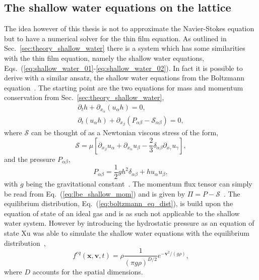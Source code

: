 \subsection{The shallow water equations on the lattice}\label{susbsec:shallow_water_lattice_boltzmann}

The idea however of this thesis is not to approximate the Navier-Stokes equation but to have a numerical solver for the thin film equation.
As outlined in Sec.~\ref{sec:theory_shallow_water} there is a system which has some similarities with the thin film equation, namely the shallow water equations, Eqs.~(\ref{eq:shallow_water_01}-\ref{eq:shallow_water_02}). 
In fact it is possible to derive with a similar ansatz, the shallow water equations from the Boltzmann equation~\cite{salmonLatticeBoltzmannMethod1999, zhouLatticeBoltzmannMethods2004, dellarNonhydrodynamicModesPriori2002}.
The starting point are the two equations for mass and momentum conservation from Sec.~\ref{sec:theory_shallow_water},
\begin{align}
    \partial_t h + \partial_{x_{\alpha}}(u_{\alpha}h) = 0, \label{eq:lbe_shallow_cont}\\
    \partial_t (u_{\alpha}h) + \partial_{x_{\beta}}(P_{\alpha\beta} - \mathcal{S}_{\alpha\beta}) = 0, \label{eq:lbe_shallow_mom}
\end{align}
where $\mathcal{S}$ can be thought of as a Newtonian viscous stress of the form,
\begin{equation}
    \mathcal{S} = \mu\left[\partial_{x_{\beta}}u_{\alpha} + \partial_{x_{\alpha}}u_{\beta} - \frac{2}{3}\delta_{\alpha\beta}\partial_{x_{\gamma}}u_{\gamma}\right],
\end{equation}
and the pressure $P_{\alpha\beta}$, 
\begin{equation}\label{eq:lbe_shallow_pressure}
    P_{\alpha\beta} = \frac{1}{2}g h^2\delta_{\alpha\beta} + h u_{\alpha}u_{\beta},
\end{equation}
with $g$ being the gravitational constant~\cite{salmonLatticeBoltzmannMethod1999}.
The momentum flux tensor can simply be read from Eq.~(\ref{eq:lbe_shallow_mom}) and is given by $\Pi = P - \mathcal{S}$~\cite{dellarNonhydrodynamicModesPriori2002}.
The equilibrium distribution, Eq.~(\ref{eq:boltzmann_eq_dist}), is build upon the equation of state of an ideal gas and is as such not applicable to the shallow water system. 
However by introducing the hydrostatic pressure as an equation of state Xu was able to simulate the shallow water equations with the equilibrium distribution~\cite{xuUNSPLITTINGBGKTYPESCHEMES1999, dellarNonhydrodynamicModesPriori2002},
\begin{equation}\label{eq:shallow_w_equilibrium}
    f^{eq}(\mathbf{x},\mathbf{v}, t) = \rho\frac{1}{(\pi g\rho)^{D/2}} e^{-\mathbf{v}^2/(g\rho)}, 
\end{equation}
where $D$ accounts for the spatial dimensions.

